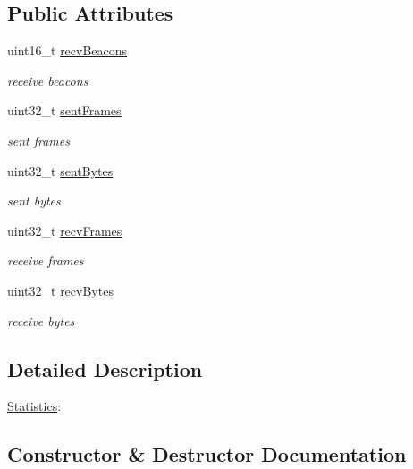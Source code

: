 \subsection*{Public Attributes}
\begin{DoxyCompactItemize}
\item 
uint16\+\_\+t \hyperlink{structns3_1_1MeshWifiInterfaceMac_1_1Statistics_ae9d9c10ed7681fe6ae3dd127ad6d5788}{recv\+Beacons}
\begin{DoxyCompactList}\small\item\em receive beacons \end{DoxyCompactList}\item 
uint32\+\_\+t \hyperlink{structns3_1_1MeshWifiInterfaceMac_1_1Statistics_a0ac5f3c2cf39ac74bf402850beb202fb}{sent\+Frames}
\begin{DoxyCompactList}\small\item\em sent frames \end{DoxyCompactList}\item 
uint32\+\_\+t \hyperlink{structns3_1_1MeshWifiInterfaceMac_1_1Statistics_a3355f31cf6a746c97c0fedba7bfdba43}{sent\+Bytes}
\begin{DoxyCompactList}\small\item\em sent bytes \end{DoxyCompactList}\item 
uint32\+\_\+t \hyperlink{structns3_1_1MeshWifiInterfaceMac_1_1Statistics_a5c415eaaf3b19754785b520741d1cb2b}{recv\+Frames}
\begin{DoxyCompactList}\small\item\em receive frames \end{DoxyCompactList}\item 
uint32\+\_\+t \hyperlink{structns3_1_1MeshWifiInterfaceMac_1_1Statistics_a1212fbc4174106637d4baa66bccecae7}{recv\+Bytes}
\begin{DoxyCompactList}\small\item\em receive bytes \end{DoxyCompactList}\end{DoxyCompactItemize}


\subsection{Detailed Description}
\hyperlink{structns3_1_1MeshWifiInterfaceMac_1_1Statistics}{Statistics}\+: 

\subsection{Constructor \& Destructor Documentation}
